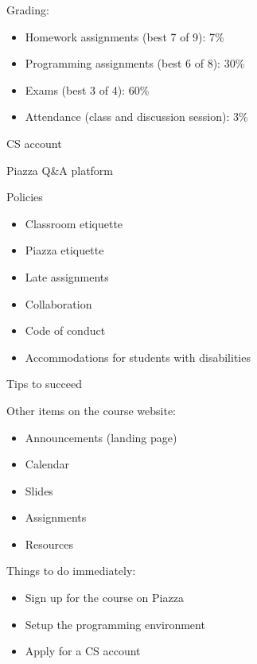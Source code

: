 \documentclass[8pt,a4paper,compress]{beamer}
\begin{document}
\begin{frame}[fragile]
Grading:
\begin{itemize}
\item Homework assignments (best 7 of 9): 7\%
\item Programming assignments (best 6 of 8): 30\%
\item Exams (best 3 of 4): 60\%
\item Attendance (class and discussion session): 3\%
\end{itemize}

\bigskip

CS account

\bigskip

Piazza Q\&A platform

\bigskip

Policies
\begin{itemize}
\item Classroom etiquette
\item Piazza etiquette
\item Late assignments
\item Collaboration
\item Code of conduct
\item Accommodations for students with disabilities
\end{itemize}
\end{frame}

\begin{frame}[fragile]
Tips to succeed

\bigskip

Other items on the course website:
\begin{itemize}
\item Announcements (landing page)
\item Calendar
\item Slides 
\item Assignments
\item Resources
\end{itemize}

\bigskip

Things to do immediately:
\begin{itemize}
\item Sign up for the course on Piazza
\item Setup the programming environment
\item Apply for a CS account
\end{itemize}
\end{frame}
\end{document}
